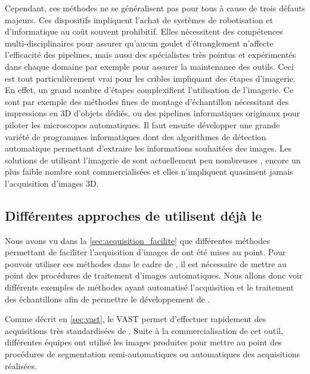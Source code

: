 \documentclass[\main/main.tex]{subfiles}
\begin{document}
%
Cependant, ces méthodes ne se généralisent pas pour tous à cause de trois défauts majeurs.
%
Ces dispositifs impliquent l'achat de systèmes de robotisation et d'informatique au coût souvent prohibitif. Elles nécessitent des compétences multi-disciplinaires pour assurer qu'aucun goulet d'étranglement n'affecte l'efficacité des pipelines, mais aussi des spécialistes très pointus et expérimentés dans chaque domaine par exemple pour assurer la maintenance des outils.
%
Ceci est tout particulièrement vrai pour les cribles impliquant des étapes d'imagerie.
%
En effet, un grand nombre d'étapes complexifient l'utilisation de l'imagerie. Ce sont par exemple des méthodes fines de montage d'échantillon nécessitant des impressions en 3D d'objets dédiés, ou des pipelines informatiques originaux pour piloter les microscopes automatiques. Il faut ensuite développer une grande variété de programmes informatiques dont des algorithmes de détection automatique permettant d'extraire les informations souhaitées des images.
%
Les solutions de \hcs{} utilisant l'imagerie de \pz{} sont actuellement peu nombreuses , encore un plus faible nombre sont commercialisées et elles n'impliquent quasiment jamais l'acquisition d'images 3D.
%
    \subsection{Différentes approches de \hcs{} utilisent déjà le \pz{}}

Nous avons vu dans la \autoref{sec:acquisition_facilite} que différentes méthodes permettant de faciliter l'acquisition d'images de \pz{}
ont été mises au point.
%
Pour pouvoir utiliser ces méthodes dans le cadre de \hcs{}, il est nécessaire de mettre au point des procédures de traitement d'images automatiques.
%
Nous allons donc voir différents exemples de méthodes ayant automatisé l'acquisition et le traitement des échantillons afin de permettre le développement de \hcs{}.


%
Comme décrit en \autoref{sec:vast}, le VAST permet d'effectuer rapidement des acquisitions très standardisées de \pz{}.
%
Suite à la commercialisation de cet outil, différentes équipes ont utilisé les images produites pour mettre au point des procédures de segmentation semi-automatiques ou automatiques des acquisitions réalisées.
%
\end{document}
